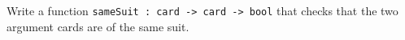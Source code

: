 Write a function \lstinline{sameSuit : card -> card -> bool} that
checks that the two argument cards are of the same suit.
